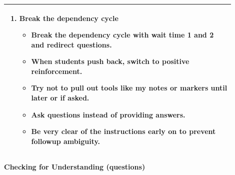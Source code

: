 \documentclass{article}
\begin{document}
\begin{flushleft}
\begin{tabular}{|p{0.9\linewidth}|}
\begin{enumerate}[label=\arabic*.]
    \item {Break the dependency cycle}
        \begin{itemize}
	    \item Break the dependency cycle with wait time 1 and 2 and redirect questions.
	    \item When students push back, switch to positive reinforcement.
	    \item Try not to pull out tools like my notes or markers until later or if asked.
	    \item Ask questions instead of providing answers.
	    \item Be very clear of the instructions early on to prevent followup ambiguity.
	\end{itemize}
\end{enumerate} \\

\hline
\end{tabular}	    



\newpage

\noindent
{\large \textbf{Checking for Understanding (questions)}} \\[0.2em]

\begin{tabular}{|p{0.9\linewidth}|}
\hline


\end{tabular}
\end{flushleft}
\end{document}
